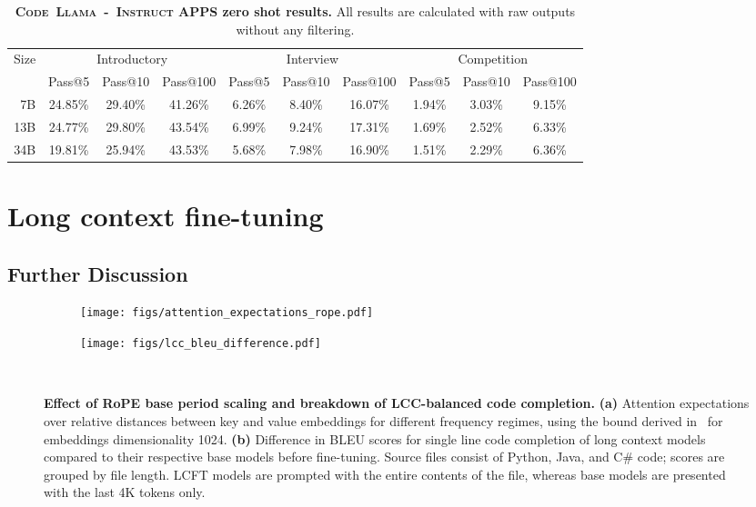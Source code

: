 \documentclass[10pt]{article}
\newcommand{\instmodel}{\textsc{Code~Llama~-~Instruct}\xspace}
\newcommand*{\acc}[1]{\num[round-mode=places,round-precision=1]{#1}\%}
\begin{document}
\begin{table}[t!]
  \center
   \setlength{\tabcolsep}{3pt}
  \begin{tabular}{rccccccccc} \toprule
  Size & \multicolumn{3}{c}{Introductory} & \multicolumn{3}{c}{Interview} & \multicolumn{3}{c}{Competition} \\
  & Pass@5 & Pass@10 & Pass@100 & Pass@5 & Pass@10 & Pass@100 & Pass@5 & Pass@10 & Pass@100 \\
    \midrule
7B  & \acc{24.85} & \acc{29.40} & \acc{41.26} & \acc{6.26} & \acc{8.40} & \acc{16.07} & \acc{1.94} & \acc{3.03} & \acc{9.15} \\
13B & \acc{24.77} & \acc{29.80} & \acc{43.54} & \acc{6.99} & \acc{9.24} & \acc{17.31} & \acc{1.69} & \acc{2.52} & \acc{6.33} \\
34B & \acc{19.81} & \acc{25.94} & \acc{43.53} & \acc{5.68} & \acc{7.98} & \acc{16.90} & \acc{1.51} & \acc{2.29} & \acc{6.36} \\
  \bottomrule
  \end{tabular}
  \caption{\textbf{\instmodel APPS zero shot results.} All results are calculated with raw outputs without any filtering. \label{tab:apps_zero_shot}}
\end{table}
 \section{Long context fine-tuning}
\label{app:lcft}

\subsection{Further Discussion}
\label{app:lcft_details}

\begin{figure}[t!]
     \centering
     \begin{subfigure}[T]{0.45\textwidth}
         \centering
         \texttt{[image: figs/attention\_expectations\_rope.pdf]}
         \caption{}
         \label{fig:rope_expectations}
     \end{subfigure}
     \hfill
     \begin{subfigure}[T]{0.45\textwidth}
         \centering
         \texttt{[image: figs/lcc\_bleu\_difference.pdf]}
         \caption{}
         \label{fig:lcft-lcc-difference}
     \end{subfigure} \\     
    \caption{\textbf{Effect of RoPE base period scaling and breakdown of LCC-balanced code completion.}
    \textbf{(a)} Attention expectations over relative distances between key and value embeddings for different frequency regimes, using the bound derived in~\citep{sun2022length} for embeddings dimensionality 1024.
    \textbf{(b)} Difference in BLEU scores for single line code completion of long context models compared to their respective base models before fine-tuning. Source files consist of Python, Java, and C\# code; scores are grouped by file length. LCFT models are prompted with the entire contents of the file, whereas base models are presented with the last 4K tokens only.
    }
    \label{fig:rope_lcc}
\end{figure}
\end{document}
